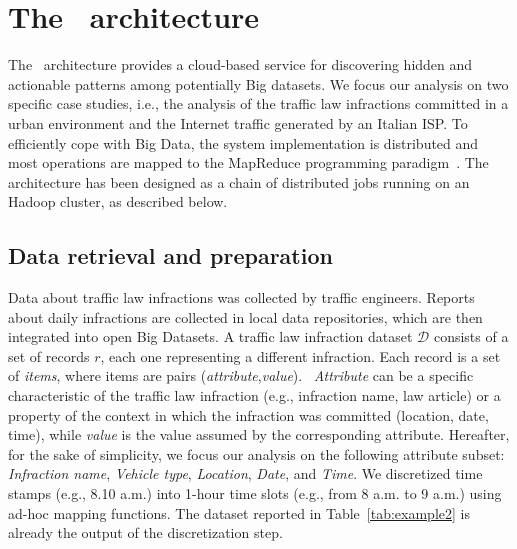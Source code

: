 \section{The \SeTAB\ architecture}
\label{setarch}

The \SeTAB\ architecture provides a cloud-based service for discovering hidden and actionable patterns among potentially Big datasets.
We focus our analysis on two specific case studies, i.e., the analysis of the traffic law infractions committed in a urban environment and the Internet traffic generated by an Italian ISP. 
To efficiently cope with Big Data, the system implementation is distributed and most operations are mapped to the MapReduce programming paradigm~\cite{Dean2008}.
The architecture has been designed as a chain of distributed jobs running on an Hadoop cluster, as described below. 


\subsection{Data retrieval and preparation}
\label{acquisitionprep}

Data about traffic law infractions was collected by traffic engineers. 
Reports about daily infractions are collected in local data repositories, which are then integrated into open Big Datasets. 
A traffic law infraction dataset $\mathcal{D}$ consists of a set of records $r$, each one representing a different infraction. 
Each record is a set of \textit{items}, where items are pairs (\textit{attribute},\textit{value}). \
\textit{Attribute} can be a specific characteristic of the traffic law infraction (e.g.,  infraction name, law article) 
or a property of the context in which the infraction was committed (location, date, time), 
while \textit{value} is the value assumed by the corresponding attribute. 
Hereafter, for the sake of simplicity, we focus our analysis on the following attribute subset: \textit{Infraction name}, \textit{Vehicle type}, \textit{Location}, \textit{Date}, and \textit{Time}. 
We discretized time stamps (e.g., 8.10 a.m.) into 1-hour time slots (e.g., from 8 a.m. to 9 a.m.) using ad-hoc mapping functions. 
The dataset reported in Table~\ref{tab:example2} is already the output of the discretization step.

